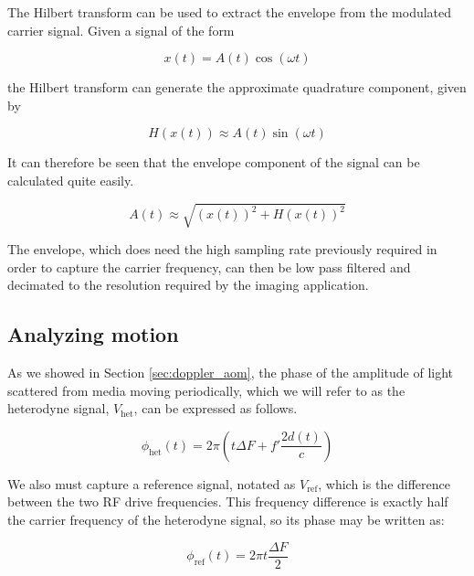 The Hilbert transform can be used to extract the envelope from the modulated carrier signal. Given a signal of the form

\begin{equation}
x(t) = A(t)\cos{(\omega t)}
\end{equation}

the Hilbert transform can generate the approximate quadrature component, given by

\begin{equation}
H(x(t)) \approx A(t) \sin{(\omega t)}
\end{equation}

It can therefore be seen that the envelope component of the signal can be calculated quite easily. \cite{oppenheim}

\begin{equation}
A(t) \approx \sqrt{(x(t))^2 + H(x(t))^2}
\end{equation}

The envelope, which does need the high sampling rate previously required in order to capture the carrier frequency, can then be low pass filtered and decimated to the resolution required by the imaging application.

\subsection{Analyzing motion}
\label{sec:sigproc_mo_anal}


As we showed in Section \ref{sec:doppler_aom}, the phase of the amplitude of light scattered from media moving periodically, which we will refer to as the heterodyne signal, $V_{\mathrm{het}}$, can be expressed as follows.

\begin{equation}
\phi_{\mathrm{het}}(t) = 2 \pi \left(t \Delta F + f'  \frac{2 d(t)}{c}    \right) 
\end{equation}

We also must capture a reference signal, notated as $V_{\mathrm{ref}}$, which is the difference between the two RF drive frequencies. This frequency difference is exactly half the carrier frequency of the heterodyne signal, so its phase may be written as:

\begin{equation}
\phi_{\mathrm{ref}}(t) = 2 \pi t \frac{\Delta F}{2}
\end{equation}

